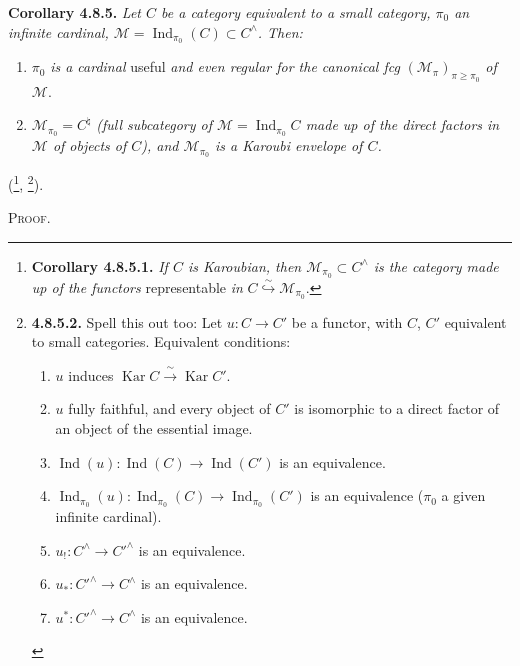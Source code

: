 \documentclass[11pt]{article}
\newcommand{\printedpage}[1]{\marginpar{\footnotesize p.~#1}}
\newcommand{\msp}[1]{\marginpar{\footnotesize [#1]}}
\newcommand{\Ind}{\operatorname{Ind}}
\newcommand{\Kar}{\operatorname{Kar}}
\begin{document}
\msp{page 201}
\textbf{Corollary 4.8.5.} \textit{Let $C$ be a category equivalent to a small category, $\pi_0$ an infinite cardinal, $\mathcal{M}=\Ind_{\pi_0}(C)\subset C^\wedge$. Then:}
\begin{enumerate}
\item[\textit{1$^\circ$)}] $\pi_0$ \textit{is a cardinal} useful \textit{and even regular for the canonical fcg} $(\mathcal{M}_\pi)_{\pi\geqslant\pi_0}$ \textit{of} $\mathcal{M}$.
\item[\textit{2$^\circ$)}] $\mathcal{M}_{\pi_0}=C^\natural$ \textit{(full subcategory of $\mathcal{M}=\Ind_{\pi_0}C$ made up of the direct factors in $\mathcal{M}$ of objects of $C$), and $\mathcal{M}_{\pi_0}$ is a Karoubi envelope of $C$.}
\end{enumerate}
(\footnote{\textbf{Corollary 4.8.5.1.} \textit{If $C$ is Karoubian, then $\mathcal{M}_{\pi_0}\subset C^\wedge$ is the category made up of the functors} representable \textit{in} $C\overset{\sim}{\hookrightarrow}\mathcal{M}_{\pi_0}$.}, \footnote{\textbf{4.8.5.2.} Spell this out too: Let $u : C\longrightarrow C'$ be a functor, with $C$, $C'$ equivalent to small categories. Equivalent conditions:
\begin{enumerate}
\item[a)] $u$ induces $\Kar C\xrightarrow{\ \sim\ }\Kar C'$.
\item[a$'$)] $u$ fully faithful, and every object of $C'$ is isomorphic to a direct factor of an object of the essential image.
\item[b)] $\Ind(u) : \Ind(C)\longrightarrow\Ind(C')$ is an equivalence.
\item[c)] $\Ind_{\pi_0}(u) : \Ind_{\pi_0}(C)\longrightarrow\Ind_{\pi_0}(C')$ is an equivalence ($\pi_0$ a given infinite cardinal).
\item[d)] $u_! : C^\wedge\longrightarrow C'^\wedge$ is an equivalence.
\item[d$'$)] $u_* : C'^\wedge\longrightarrow C^\wedge$ is an equivalence.
\item[d$''$)] $u^* : C'^\wedge\longrightarrow C^\wedge$ is an equivalence.
\end{enumerate}}).

\printedpage{71}

\textsc{Proof.}
\end{document}
